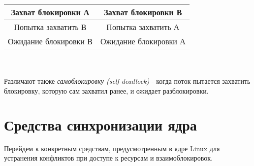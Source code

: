 \begin{enumerate}
\begin{center}
\begin{tabular}{||c c||}
            \hline\hline
            Захват блокировки А & Захват блокировки В \\ 
            \hline
            Попытка захватить В & Попытка захватить А \\
            \hline
            Ожидание блокировки В & Ожидание блокировки А \\ [1ex]
            \hline
        \end{tabular}
    \end{center}
    \\\\ 
    Различают также \textit{самоблокировку (self-deadlock)} - когда поток пытается захватить блокировку, которую сам захватил ранее, и ожидает разблокировки.
\end{enumerate}

\section{Средства синхронизации ядра}
Перейдем к конкретным средствам, предусмотренным в ядре Linux для устранения конфликтов при доступе к ресурсам и взаимоблокировок.
